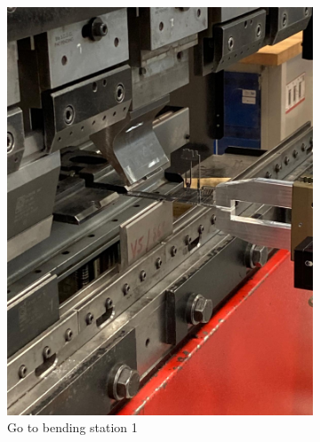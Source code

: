 \begin{figure}[h]
    \centering
    \begin{subfigure}[b]{0.32\textwidth}
        \centering
        \includegraphics[width=\textwidth]{figures/bending/bending5-001.png}
        \caption{Go to bending station 1}
        \label{subfig:bending5-before}
    \end{subfigure}\hspace{0.1cm}
    \begin{subfigure}[b]{0.32\textwidth}
        \centering

\end{subfigure}
\end{figure}
